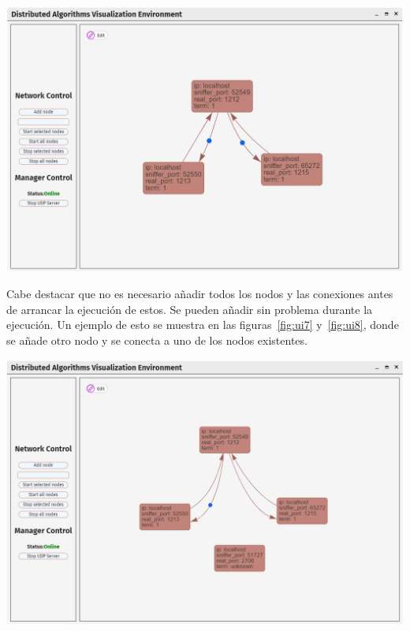{
\centering
\includegraphics[width=0.9\linewidth]{imagenes/ui6}
\label{fig:ui6}
}

Cabe destacar que no es necesario añadir todos los nodos y las conexiones antes de arrancar la ejecución de estos. Se pueden añadir sin problema durante la ejecución. Un ejemplo de esto se muestra en las figuras~\ref{fig:ui7} y~\ref{fig:ui8}, donde se añade otro nodo y se conecta a uno de los nodos existentes.

\newpage

{
\centering
\includegraphics[width=0.9\linewidth]{imagenes/ui7}
\label{fig:ui7}
}

